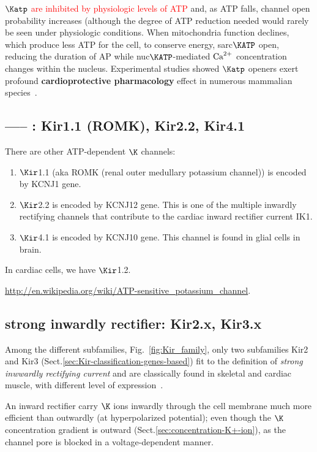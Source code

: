 \textcolor{red}{$\Katp$ are inhibited by physiologic levels of ATP}
and, as ATP falls, channel open probability increases (although the degree of
ATP reduction needed would rarely be seen under physiologic conditions.
When mitochondria function declines, which produce less ATP for the cell, to
conserve energy, sarc$\KATP$ open, reducing the duration of AP while
nuc$\KATP$-mediated ${\text{Ca}^{2+}}$ concentration changes within the nucleus.
Experimental studies showed $\Katp$ openers exert profound {\bf cardioprotective
pharmacology} effect in numerous mammalian species~\citep{Grover2000}.

\subsection{----- : Kir1.1 (ROMK), Kir2.2, Kir4.1}
\label{sec:Kir_KATP_Kir2.1-2.2}

There are other ATP-dependent $\K$ channels:
\begin{enumerate}
  \item $\Kir$1.1  (aka ROMK (renal outer medullary potassium channel)) is
  encoded by KCNJ1 gene.
  
  \item $\Kir$2.2 is encoded by KCNJ12 gene. This is one of the multiple
  inwardly rectifying channels that contribute to the cardiac inward rectifier
  current IK1.
  
  \item $\Kir$4.1 is encoded by KCNJ10 gene. This channel is found in glial
  cells in brain.
\end{enumerate}

In cardiac cells, we have $\Kir$1.2.

\url{http://en.wikipedia.org/wiki/ATP-sensitive_potassium_channel}.

\subsection{strong inwardly rectifier: Kir2.x, Kir3.x}
\label{sec:inward-rectifier-strongly}
\label{sec:Kir-strong}

Among the different subfamilies, Fig.~\ref{fig:Kir_family}, only two subfamilies
Kir2 and Kir3 (Sect.\ref{sec:Kir-classification-genes-based}) fit to the
definition of {\it strong inwwardly rectifying current} and are classically
found in skeletal and cardiac muscle, with different level of
expression~\citep{Anumonwo2010}.

An inward rectifier carry $\K$ ions inwardly through the cell membrane much more
efficient than outwardly (at hyperpolarized potential); even though the $\K$
concentration gradient is outward (Sect.\ref{sec:concentration-K+-ion}), as the
channel pore is blocked in a voltage-dependent manner.

